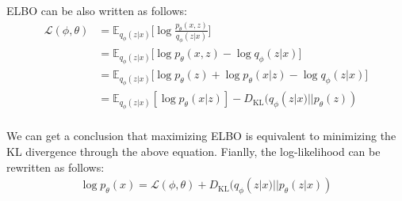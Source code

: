 ELBO can be also written as follows:
\begin{align*}
\mathcal{L}(\phi,\theta) & = \mathbb{E}_{q_{\phi}(z|x)}\Bigg[\log \frac{p_{\theta}(x,z)}{q_{\phi}(z|x) }\Bigg]\\
& = \mathbb{E}_{q_{\phi}(z|x)}\Bigg[\log p_{\theta}(x,z)-\log q_{\phi}(z|x)\Bigg]\\
& = \mathbb{E}_{q_{\phi}(z|x)}\Bigg[\log p_{\theta}(z)+\log p_{\theta}(x|z)-\log q_{\phi}(z|x)\Bigg]\\
& = \mathbb{E}_{q_{\phi}(z|x)}[\log p_{\theta}(x|z)] - D_{\textrm{KL}}(q_{\phi}(z|x)||p_{\theta}(z))\\
\end{align*}

We can get a conclusion that maximizing ELBO is equivalent to minimizing the KL divergence through the above equation. Fianlly, the log-likelihood can be rewritten as follows:
\begin{align*}
	\log p_{\theta}(x) = \mathcal{L}(\phi,\theta) + D_{\textrm{KL}}(q_{\phi}(z|x)||p_{\theta}(z|x))
\end{align*}



